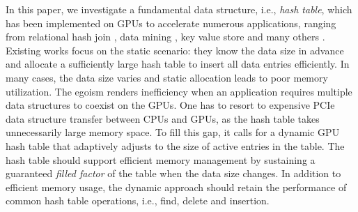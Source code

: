 In this paper, we investigate a fundamental data structure, i.e., \emph{hash table}, which has been implemented on GPUs to accelerate numerous applications, ranging from relational hash join \cite{he2008relational,he2009relational,heimel2013hardware}, data mining \cite{pan2011fast,zhou2010parallel,zhong2014medusa},  key value store \cite{zhang2015mega,hetherington2015memcachedgpu,breslow2016horton} and many others \cite{bowers2010parallel,pan2010efficient,garcia2011coherent,niessner2013real,wu2015gpu}. Existing works \cite{alcantara2009real,zhang2015mega,hong2010mapcg,hetherington2015memcachedgpu,breslow2016horton} focus on the static scenario: they know the data size in advance and allocate a sufficiently large hash table to insert all data entries efficiently. In many cases, the data size varies \cite{xxx} and static allocation leads to poor memory utilization. 
The egoism renders inefficiency when an application requires multiple data structures to coexist on the GPUs. One has to resort to expensive PCIe data structure transfer between CPUs and GPUs, as the hash table takes unnecessarily large memory space. 
To fill this gap, it calls for a dynamic GPU hash table that adaptively adjusts to the size of active entries in the table. The hash table should support efficient memory management by sustaining a guaranteed \emph{filled factor} of the table when the data size changes. 
In addition to efficient memory usage, the dynamic approach should retain the performance of common hash table operations, i.e., find, delete and insertion.


